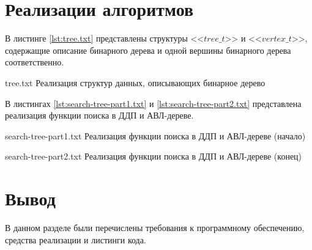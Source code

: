 \clearpage

\section{Реализации алгоритмов}

В листинге \ref{lst:tree.txt} представлены структуры <<$tree\_t$>> и  <<$vertex\_t$>>, содержащие описание бинарного дерева и одной вершины бинарного дерева соответственно.

{tree.txt} %
{Реализация структур данных, описывающих бинарное дерево} %

В листингах \ref{lst:search-tree-part1.txt} и \ref{lst:search-tree-part2.txt} представлена реализация функции поиска в ДДП и АВЛ-дереве.

{search-tree-part1.txt} %
{Реализация функции поиска в ДДП и АВЛ-дереве (начало)} %

{search-tree-part2.txt} %
{Реализация функции поиска в ДДП и АВЛ-дереве (конец)} %

\section*{Вывод}

В данном разделе были перечислены требования к программному обеспечению, средства реализации и листинги кода.

    